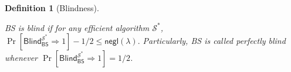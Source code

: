 \documentclass[conference]{IEEEtran}
\newtheorem{definition}{Definition}[section]
\begin{document}
	\begin{definition}[Blindness] \label{bli}
		\iffalse
		The game is below:
		
		\begin{enumerate}
			\item  \textbf{Initial.} The adversary $\mathcal{S}^*$ chooses a security parameter $\lambda$, obtains $\mathsf{par}$ using \textsf{Setup}$(1^{\lambda})$. Then $\mathcal{S}^*$ invokes \textsf{KeyGen}$(\mathsf{par})$ to have the public key/secret key $\mathsf{pk}/ \mathsf{sk}$. 
			\item \textbf{Challenge.} $\mathcal{S}^*$ selects and gives  the challenger $\mathcal{C}$ two messages $\mu_0$ and  $\mu_1$. The challenger $\mathcal{C}$ tosses a coin $b \in \{0, 1\}$ and initiates an interactive blind signature protocol with  $\mathcal{S}^*$ on input $\mu_b$. The adversary $\mathcal{S}^*$ plays the role the signer in the protocol and gets the view $\mathcal{V}$.
			\item \textbf{Output.} The adversary $\mathcal{S}^*$ guesses whether $b$ is 0 or 1. He wins if his guess is right.
			
		\end{enumerate}
		\fi
		\textsf{BS} is \textit{blind} if for any efficient algorithm  $\mathcal{S}^*$,
		$\Pr[\textsf{Blind}_{\textsf{BS}}^{\mathcal{S}^*}\Rightarrow 1]-1/2 \leq \textsf{negl}(\lambda).$
		Particularly, \textsf{BS} is called \textit{perfectly blind} whenever $\Pr[\textsf{Blind}_{\textsf{BS}}^{\mathcal{S}^*}\Rightarrow 1]=1/2$. 
	\end{definition}
	
\end{document}

